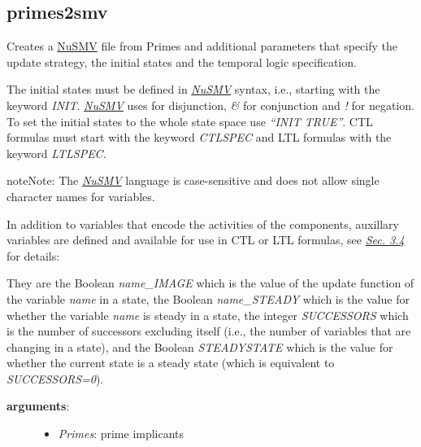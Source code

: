 \documentclass[letterpaper,10pt,english]{sphinxmanual}
\begin{document}
\subsection{primes2smv}
\label{ModelChecking:id7}\label{ModelChecking:primes2smv}

\begin{fulllineitems}
\label{ModelChecking:PyBoolNet.ModelChecking.primes2smv}
Creates a \href{http://nusmv.fbk.eu}{NuSMV} file from Primes and additional parameters that specify the update strategy, the initial states and the temporal logic specification.

The initial states must be defined in {\hyperref[Installation:installation-nusmv]{\emph{NuSMV}}} syntax, i.e.,
starting with the keyword \emph{INIT}.
{\hyperref[Installation:installation-nusmv]{\emph{NuSMV}}} uses \emph{\textbar{}} for disjunction, \emph{\&} for conjunction and \emph{!} for negation.
To set the initial states to the whole state space use \emph{``INIT TRUE''}.
CTL formulas must start with the keyword \emph{CTLSPEC} and LTL formulas with the keyword \emph{LTLSPEC}.

\begin{notice}{note}{Note:}
The {\hyperref[Installation:installation-nusmv]{\emph{NuSMV}}} language is case-sensitive and does not allow single character names for variables.
\end{notice}

In addition to variables that encode the activities of the components,
auxillary variables are defined and available for use in CTL or LTL formulas,
see {\hyperref[Manual:sec-model-checking]{\emph{Sec. 3.4}}} for details:

They are the Boolean \emph{name\_IMAGE} which is the value of the update function of the variable \emph{name} in a state,
the Boolean \emph{name\_STEADY} which is the value for whether the variable \emph{name} is steady in a state,
the integer \emph{SUCCESSORS} which is the number of successors excluding itself (i.e., the number of variables that are changing in a state), and
the Boolean \emph{STEADYSTATE} which is the value for whether the current state is a steady state (which is equivalent to \emph{SUCCESSORS=0}).
\begin{description}
\item[{\textbf{arguments}:}] \leavevmode\begin{itemize}
\item {} 
\emph{Primes}: prime implicants


\end{itemize}
\end{description}
\end{fulllineitems}
\end{document}
